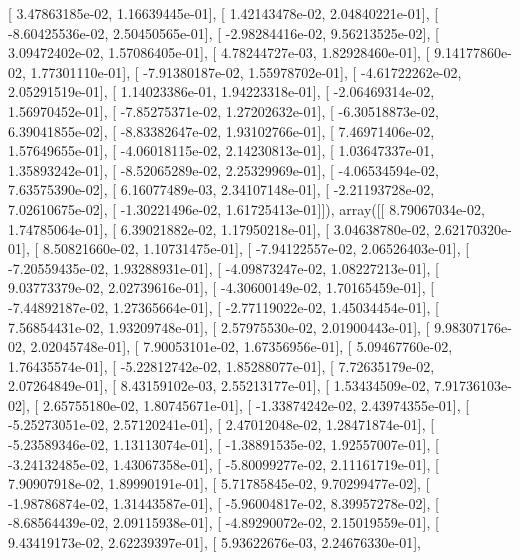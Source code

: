 \documentclass{article}
\begin{document}
       [  3.47863185e-02,   1.16639445e-01],
       [  1.42143478e-02,   2.04840221e-01],
       [ -8.60425536e-02,   2.50450565e-01],
       [ -2.98284416e-02,   9.56213525e-02],
       [  3.09472402e-02,   1.57086405e-01],
       [  4.78244727e-03,   1.82928460e-01],
       [  9.14177860e-02,   1.77301110e-01],
       [ -7.91380187e-02,   1.55978702e-01],
       [ -4.61722262e-02,   2.05291519e-01],
       [  1.14023386e-01,   1.94223318e-01],
       [ -2.06469314e-02,   1.56970452e-01],
       [ -7.85275371e-02,   1.27202632e-01],
       [ -6.30518873e-02,   6.39041855e-02],
       [ -8.83382647e-02,   1.93102766e-01],
       [  7.46971406e-02,   1.57649655e-01],
       [ -4.06018115e-02,   2.14230813e-01],
       [  1.03647337e-01,   1.35893242e-01],
       [ -8.52065289e-02,   2.25329969e-01],
       [ -4.06534594e-02,   7.63575390e-02],
       [  6.16077489e-03,   2.34107148e-01],
       [ -2.21193728e-02,   7.02610675e-02],
       [ -1.30221496e-02,   1.61725413e-01]]), array([[  8.79067034e-02,   1.74785064e-01],
       [  6.39021882e-02,   1.17950218e-01],
       [  3.04638780e-02,   2.62170320e-01],
       [  8.50821660e-02,   1.10731475e-01],
       [ -7.94122557e-02,   2.06526403e-01],
       [ -7.20559435e-02,   1.93288931e-01],
       [ -4.09873247e-02,   1.08227213e-01],
       [  9.03773379e-02,   2.02739616e-01],
       [ -4.30600149e-02,   1.70165459e-01],
       [ -7.44892187e-02,   1.27365664e-01],
       [ -2.77119022e-02,   1.45034454e-01],
       [  7.56854431e-02,   1.93209748e-01],
       [  2.57975530e-02,   2.01900443e-01],
       [  9.98307176e-02,   2.02045748e-01],
       [  7.90053101e-02,   1.67356956e-01],
       [  5.09467760e-02,   1.76435574e-01],
       [ -5.22812742e-02,   1.85288077e-01],
       [  7.72635179e-02,   2.07264849e-01],
       [  8.43159102e-03,   2.55213177e-01],
       [  1.53434509e-02,   7.91736103e-02],
       [  2.65755180e-02,   1.80745671e-01],
       [ -1.33874242e-02,   2.43974355e-01],
       [ -5.25273051e-02,   2.57120241e-01],
       [  2.47012048e-02,   1.28471874e-01],
       [ -5.23589346e-02,   1.13113074e-01],
       [ -1.38891535e-02,   1.92557007e-01],
       [ -3.24132485e-02,   1.43067358e-01],
       [ -5.80099277e-02,   2.11161719e-01],
       [  7.90907918e-02,   1.89990191e-01],
       [  5.71785845e-02,   9.70299477e-02],
       [ -1.98786874e-02,   1.31443587e-01],
       [ -5.96004817e-02,   8.39957278e-02],
       [ -8.68564439e-02,   2.09115938e-01],
       [ -4.89290072e-02,   2.15019559e-01],
       [  9.43419173e-02,   2.62239397e-01],
       [  5.93622676e-03,   2.24676330e-01],
\end{document}
